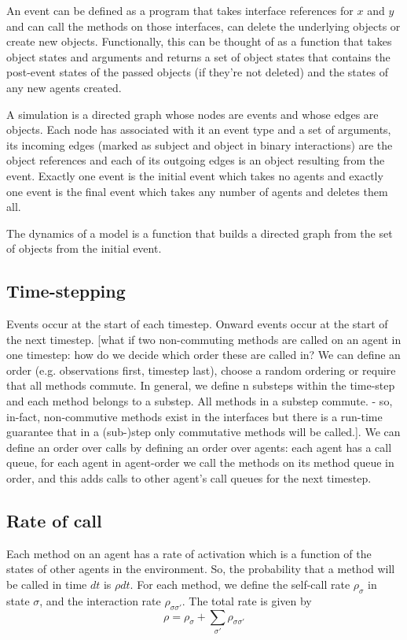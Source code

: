 \documentclass[a4paper]{article}
\begin{document}
An event can be defined as a program that takes interface references for $x$ and $y$ and can call the methods on those interfaces, can delete the underlying objects or create new objects. Functionally, this can be thought of as a function that takes object states and arguments and returns a set of object states that contains the post-event states of the passed objects (if they're not deleted) and the states of any new agents created.

A simulation is a directed graph whose nodes are events and whose edges are objects. Each node has associated with it an event type and a set of arguments, its incoming edges (marked as subject and object in binary interactions) are the object references and each of its outgoing edges is an object resulting from the event. Exactly one event is the initial event which takes no agents and exactly one event is the final event which takes any number of agents and deletes them all.

The dynamics of a model is a function that builds a directed graph from the set of objects from the initial event.


\subsection{Time-stepping}

Events occur at the start of each timestep. Onward events occur at the start of the next timestep. [what if two non-commuting methods are called on an agent in one timestep: how do we decide which order these are called in? We can define an order (e.g. observations first, timestep last), choose a random ordering or require that all methods commute. In general, we define n substeps within the time-step and each method belongs to a substep. All methods in a substep commute. - so, in-fact, non-commutive methods exist in the interfaces but there is a run-time guarantee that in a (sub-)step only commutative methods will be called.]. We can define an order over calls by defining an order over agents: each agent has a call queue, for each agent in agent-order we call the methods on its method queue in order, and this adds calls to other agent's call queues for the next timestep.

\subsection{Rate of call}

Each method on an agent has a rate of activation which is a function of the states of other agents in the environment. So, the probability that a method will be called in time $dt$ is $\rho dt$. For each method, we define the self-call rate $\rho_\sigma$ in state $\sigma$, and the interaction rate $\rho_{\sigma \sigma'}$. The total rate is given by
\[
\rho = \rho_\sigma + \sum_{\sigma'} \rho_{\sigma\sigma'}
\]
\end{document}
